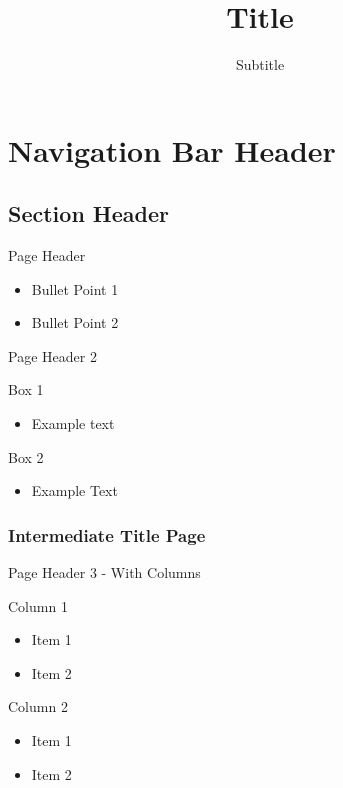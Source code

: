 \documentclass[
  ignorenonframetext,
]{beamer}
\title{Title}
\subtitle{Subtitle}
\author{}
\date{\vspace{-2.5em}}
\providecommand{\tightlist}{%
  \setlength{\itemsep}{0pt}\setlength{\parskip}{0pt}}
\begin{document}
\frame{\titlepage}

\section{Navigation Bar Header}\label{navigation-bar-header}

\subsection{Section Header}\label{section-header}

\begin{frame}{Page Header}
\label{page-header}
\begin{itemize}
\tightlist
\item
  Bullet Point 1
\item
  Bullet Point 2
\end{itemize}
\end{frame}

\begin{frame}{Page Header 2}
\label{page-header-2}
\begin{block}{Box 1}
\label{box-1}
\begin{itemize}
\tightlist
\item
  Example text
\end{itemize}
\end{block}

\begin{block}{Box 2}
\label{box-2}
\begin{itemize}
\tightlist
\item
  Example Text
\end{itemize}
\end{block}
\end{frame}

\subsubsection{Intermediate Title Page}\label{intermediate-title-page}

\begin{frame}{Page Header 3 - With Columns}
\label{page-header-3---with-columns}
\begincols

Column 1

\begin{itemize}
\tightlist
\item
  Item 1
\item
  Item 2
\end{itemize}

\endcol


Column 2

\begin{itemize}
\tightlist
\item
  Item 1
\item
  Item 2
\end{itemize}

\endcol \endcols
\end{frame}
\end{document}
